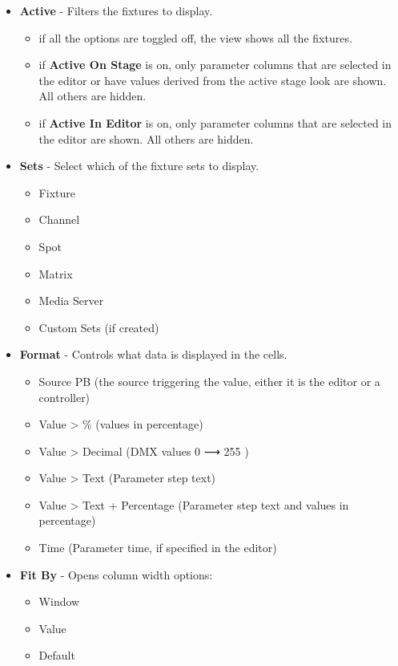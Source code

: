 \documentclass[
]{article}
\begin{document}
\begin{itemize}
\item
  \textbf{Active} - Filters the fixtures to display.

  \begin{itemize}
  \item
    if all the options are toggled off, the view shows all the fixtures.
  \item
    if \textbf{Active On Stage} is on, only parameter columns that are selected in the editor or have values derived from the active stage look are shown. All others are hidden.
  \item
    if \textbf{Active In Editor} is on, only parameter columns that are selected in the editor are shown. All others are hidden.
  \end{itemize}
\item
  \textbf{Sets} - Select which of the fixture sets to display.

  \begin{itemize}
  \item
    Fixture
  \item
    Channel
  \item
    Spot
  \item
    Matrix
  \item
    Media Server
  \item
    Custom Sets (if created)
  \end{itemize}
\item
  \textbf{Format} - Controls what data is displayed in the cells.

  \begin{itemize}
  \item
    Source PB (the source triggering the value, either it is the editor or a controller)
  \item
    Value \textgreater{} \% (values in percentage)
  \item
    Value \textgreater{} Decimal (DMX values 0 ⟶ 255 )
  \item
    Value \textgreater{} Text (Parameter step text)
  \item
    Value \textgreater{} Text + Percentage (Parameter step text and values in percentage)
  \item
    Time (Parameter time, if specified in the editor)
  \end{itemize}
\item
  \textbf{Fit By} - Opens column width options:

  \begin{itemize}
  \item
    Window
  \item
    Value
  \item
    Default
  \end{itemize}
\end{itemize}
\end{document}
